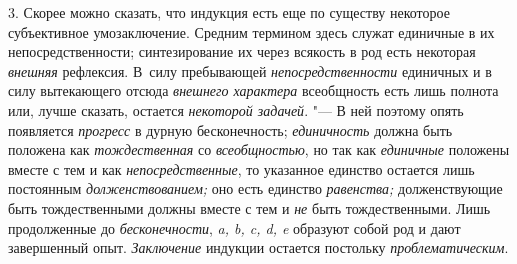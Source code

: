 3. Скорее можно сказать, что индукция есть еще по существу
некоторое субъективное умозаключение. Средним термином здесь служат
единичные в их непосредственности; синтезирование их через всякость в род
есть некоторая {\em внешняя}
рефлексия. В~силу пребывающей
{\em непосредственности}
единичных и в силу вытекающего отсюда
{\em внешнего характера}
всеобщность есть лишь полнота или, лучше
сказать, остается {\em некоторой
задачей}. "--- В ней поэтому опять появляется
{\em прогресс} в дурную
бесконечность; {\em единичность}
должна быть положена как
{\em тождественная} со
{\em всеобщностью}, но
так как {\em единичные}
положены вместе с тем и как
{\em непосредственные},
то указанное единство остается лишь постоянным
{\em долженствованием;}
оно есть единство
{\em равенства;}
долженствующие быть тождественными должны вместе с тем и
{\em не} быть
тождественными. Лишь продолженные до
{\em бесконечности},
{\em a, b, c, d, e} образуют собой род и
дают завершенный опыт. {\em Заключение}
индукции остается постольку
{\em проблематическим}.

